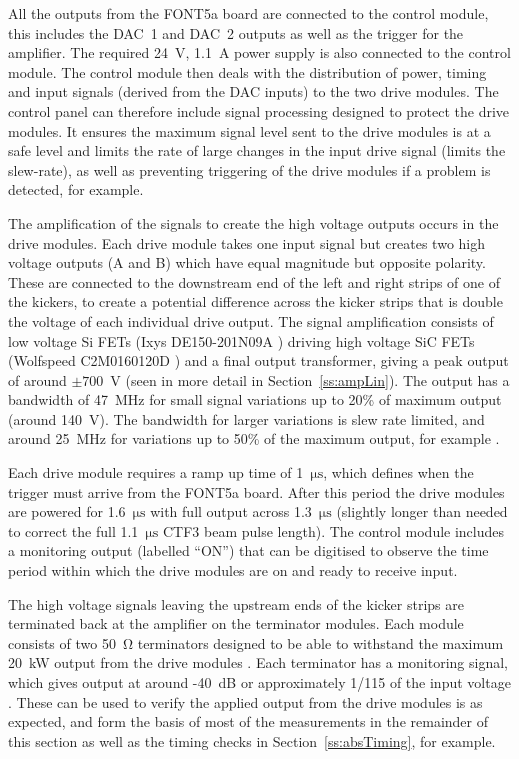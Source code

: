 All the outputs from the FONT5a board are connected to the control module, this includes the DAC~1 and DAC~2 outputs as well as the trigger for the amplifier. The required 24~V, 1.1~A power supply is also connected to the control module. The control module then deals with the distribution of power, timing and input signals (derived from the DAC inputs) to the two drive modules. The control panel can therefore include signal processing designed to protect the drive modules. It ensures the maximum signal level sent to the drive modules is at a safe level and limits the rate of large changes in the input drive signal (limits the slew-rate), as well as preventing triggering of the drive modules if a problem is detected, for example.

The amplification of the signals to create the high voltage outputs occurs in the drive modules. Each drive module takes one input signal but creates two high voltage outputs (A and B) which have equal magnitude but opposite polarity. These are connected to the downstream end of the left and right strips of one of the kickers, to create a potential difference across the kicker strips that is double the voltage of each individual drive output. The signal amplification consists of low voltage Si FETs (Ixys DE150-201N09A \cite{ixysFET}) driving high voltage SiC FETs (Wolfspeed C2M0160120D \cite{wolfFET}) and a final output transformer, giving a peak output of around \(\pm700\)~V (seen in more detail in Section~\ref{ss:ampLin}). The output has a bandwidth of 47~MHz for small signal variations up to 20\% of maximum output (around 140~V). The bandwidth for larger variations is slew rate limited, and around 25~MHz for variations up to 50\% of the maximum output, for example \cite{colinCLIC16}.

Each drive module requires a ramp up time of 1~\(\mathrm{\mu s}\), which defines when the trigger must arrive from the FONT5a board. After this period the drive modules are powered for 1.6~\(\mathrm{\mu s}\)  with full output across 1.3~\(\mathrm{\mu s}\) (slightly longer than needed to correct the full 1.1~\(\mathrm{\mu s}\) CTF3 beam pulse length). The control module includes a monitoring output (labelled ``ON'') that can be digitised to observe the time period within which the drive modules are on and ready to receive input.

The high voltage signals leaving the upstream ends of the kicker strips are terminated back at the amplifier on the terminator modules. Each module consists of two 50~\(\mathrm{\Omega}\) terminators designed to be able to withstand the maximum 20~kW output from the drive modules \cite{colinCLIC16}. Each terminator has a monitoring signal, which gives output at around -40~dB or approximately 1/115 of the input voltage \cite{colinPriv}. These can be used to verify the applied output from the drive modules is as expected, and form the basis of most of the measurements in the remainder of this section as well as the timing checks in Section~\ref{ss:absTiming}, for example.

